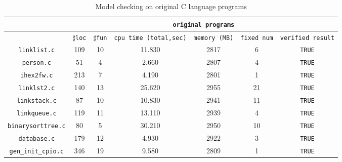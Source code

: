 \begin{table}
  \scriptsize
\begin{tabular}{|c|c|c|c|c|c|c|}
\hline
& \multicolumn{6}{|c|}{\texttt{original programs}}  \\
\hline
 & $\sharp$\texttt{loc} & $\sharp$\texttt{fun} & \texttt{cpu time (total,sec)} & \texttt{memory (MB)} & \texttt{fixed num}& \texttt{verified result} \\
\hline
\texttt{linklist.c} & 109 & 10 & 11.830 & 2817 & 6 & \texttt{TRUE}  \\
\hline
\texttt{person.c} & 51 & 4 & 2.660 & 2807 & 4 & \texttt{TRUE}   \\
\hline
\texttt{ihex2fw.c} & 213 & 7 & 4.190 & 2801 & 1 &  \texttt{TRUE} \\
\hline
\texttt{linklst2.c} & 140 & 13 & 25.620 & 2955 & 21 & \texttt{TRUE} \\
\hline
\texttt{linkstack.c}  & 87 & 10 & 10.830 & 2941 & 11 & \texttt{TRUE} \\
\hline
\texttt{linkqueue.c} & 119 & 11 & 13.110 & 2939 & 4 & \texttt{TRUE} \\
\hline
\texttt{binarysorttree.c} & 80 & 5 & 30.210 & 2950 & 10 &\texttt{TRUE}  \\
\hline
\texttt{database.c} & 179 & 12 & 4.930 & 2922 & 3 & \texttt{TRUE} \\
\hline
\texttt{gen\_init\_cpio.c} & 346 & 19 & 9.580 & 2809 & 1 & \texttt{TRUE} \\
\hline
\end{tabular}
\caption{Model checking on original C language programs}
\label{tb:mcc}
\end{table}

